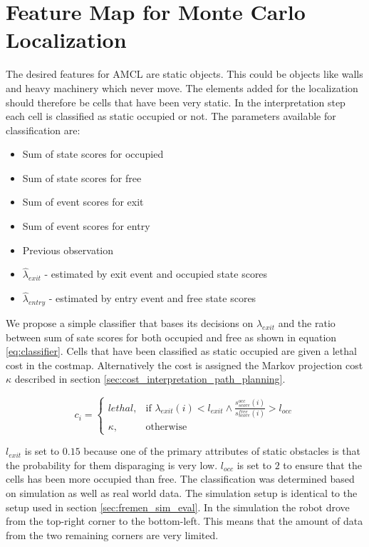\section{Feature Map for Monte Carlo Localization}
\label{sec:localzation_feature_map}
The desired features for AMCL are static objects. 
This could be objects like walls and heavy machinery which never move.  
The elements added for the localization should therefore be cells that have been very static. 
In the interpretation step each cell is classified as static occupied or not. 
The parameters available for classification are:
\begin{itemize} 
\item Sum of state scores for occupied
\item Sum of state scores for free
\item Sum of event scores for exit
\item Sum of event scores for entry
\item Previous observation
\item \(\hat{\lambda}_{exit}\) - estimated by exit event and occupied state scores
\item \(\hat{\lambda}_{entry}\) - estimated by entry event and free state scores
\end{itemize}

We propose a simple classifier that bases its decisions on \(\lambda_{exit}\) and the ratio between sum of sate scores for both occupied and free as shown in equation \ref{eq:classifier}. 
Cells that have been classified as static occupied are given a lethal cost in the costmap. Alternatively the cost is assigned the Markov projection cost $\kappa$ described in section \ref{sec:cost_interpretation_path_planning}. 

\begin{equation}
\label{eq:classifier}
c_i = 
\begin{cases}
lethal, & \text{if } \lambda_{exit}(i) < l_{exit} \land \frac{s_{score}^{occ}(i)}{s_{score}^{free}(i)}  > l_{occ}
\\
\kappa, & \text{otherwise}
\end{cases}
\end{equation}

$l_{exit}$ is set to $0.15$ because one of the primary attributes of static obstacles is that the probability for them disparaging is very low.
$l_{occ}$ is set to $2$ to ensure that the cells has been more occupied than free. 
The classification was determined based on simulation as well as real world data.
The simulation setup is identical to the setup used in section \ref{sec:fremen_sim_eval}. 
In the simulation the robot drove from the top-right corner to the bottom-left. This means that the amount of data from the two remaining corners are very limited.

